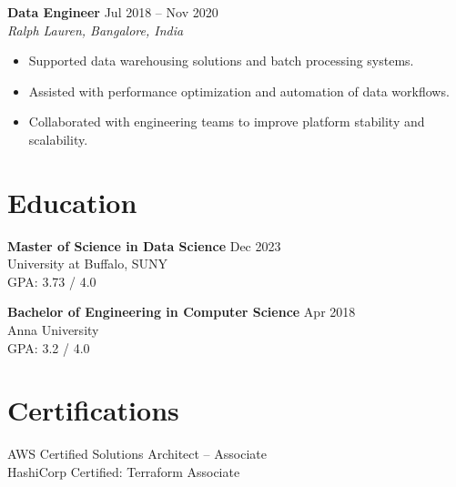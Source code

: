 \documentclass[10pt]{article}
\begin{document}
\textbf{Data Engineer} \hfill Jul 2018 -- Nov 2020 \\
\textit{Ralph Lauren, Bangalore, India}
\begin{itemize}[leftmargin=*, itemsep=3pt]
    \item Supported data warehousing solutions and batch processing systems.
    \item Assisted with performance optimization and automation of data workflows.
    \item Collaborated with engineering teams to improve platform stability and scalability.
\end{itemize}

\section*{Education}

\textbf{Master of Science in Data Science} \hfill Dec 2023 \\
University at Buffalo, SUNY \\
GPA: 3.73 / 4.0

\textbf{Bachelor of Engineering in Computer Science} \hfill Apr 2018 \\
Anna University \\
GPA: 3.2 / 4.0

\section*{Certifications}
AWS Certified Solutions Architect – Associate \\
HashiCorp Certified: Terraform Associate
\end{document}
